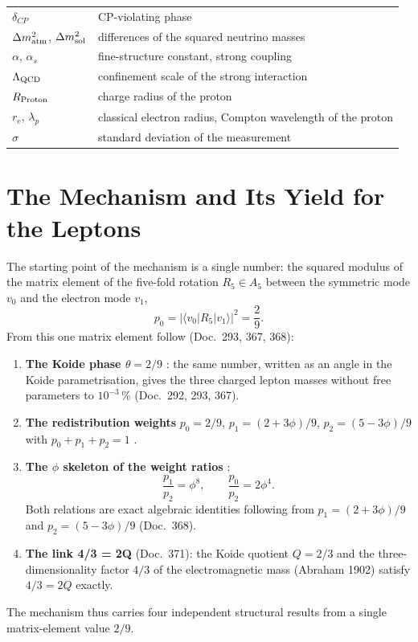 \begin{tabular}{@{}lp{9cm}@{}}
$\delta_{CP}$ & CP-violating phase \\
$\Delta m^2_{\rm atm}$, $\Delta m^2_{\rm sol}$ & differences of the squared neutrino masses \\
$\alpha$, $\alpha_s$ & fine-structure constant, strong coupling \\
$\Lambda_{\rm QCD}$ & confinement scale of the strong interaction \\
$R_{\rm Proton}$ & charge radius of the proton \\
$r_e$, $\lambda_p$ & classical electron radius, Compton wavelength of the proton \\
$\sigma$ & standard deviation of the measurement \\
\bottomrule
\end{tabular}

\section{The Mechanism and Its Yield for the Leptons}
\label{sec:ertrag}

The starting point of the mechanism is a single number: the squared modulus
of the matrix element of the five-fold rotation $R_5 \in A_5$ between the
symmetric mode $v_0$ and the electron mode $v_1$,
\[
  p_0 = |\langle v_0|R_5|v_1\rangle|^2 = \frac{2}{9}.
\]
From this one matrix element follow (Doc.~293, 367, 368):

\begin{enumerate}
\item \textbf{The Koide phase $\theta = 2/9$} \BM: the same number, written
  as an angle in the Koide parametrisation, gives the three charged lepton
  masses without free parameters to $10^{-3}$\,\% (Doc.~292, 293, 367).
\item \textbf{The redistribution weights} $p_0 = 2/9$, $p_1 = (2+3\phi)/9$,
  $p_2 = (5-3\phi)/9$ with $p_0+p_1+p_2 = 1$ \BM.
\item \textbf{The $\phi$ skeleton of the weight ratios} \BM:
  \[
    \frac{p_1}{p_2} = \phi^8, \qquad \frac{p_0}{p_2} = 2\phi^4.
  \]
  Both relations are exact algebraic identities following from
  $p_1=(2+3\phi)/9$ and $p_2=(5-3\phi)/9$ (Doc.~368).
\item \textbf{The link 4/3 = 2Q} (Doc.~371): the Koide quotient $Q = 2/3$ and
  the three-dimensionality factor $4/3$ of the electromagnetic mass
  (Abraham 1902) satisfy $4/3 = 2Q$ exactly.
\end{enumerate}

The mechanism thus carries four independent structural results from a
single matrix-element value $2/9$.


